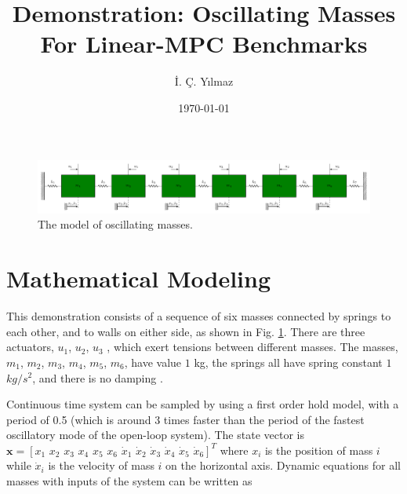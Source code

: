 \documentclass[12pt]{article}
\title{Demonstration: Oscillating Masses For Linear-MPC Benchmarks}
\author{İ. Ç. Yılmaz}
\date{\today}
\begin{document}
\maketitle%
\begin{figure}[b]
	\centering
	\includegraphics[width=1.0\textwidth,keepaspectratio]{images/oscillating_masses_tikz.pdf}
	\caption{The model of oscillating masses.} 
	\label{fig:oscillating_masses}	
\end{figure}
\section{Mathematical Modeling} \label{Mathematical_Modeling}
\noindent This demonstration consists of a sequence of six masses connected by springs to each other, and to walls on either side, as shown in Fig. \ref{fig:oscillating_masses}. There are three actuators, $u_{1}$, $u_{2}$, $u_{3}$ , which exert tensions between different masses. The masses, $m_{1}$, $m_{2}$, $m_{3}$, $m_{4}$, $m_{5}$, $m_{6}$, have value $1$ kg, the springs
all have spring constant $1$ $kg/s^{2}$, and there is no damping \cite{Wang2010}. \newline
\par\noindent Continuous time system can be sampled by using a first order
hold model, with a period of 0.5 (which is around 3 times faster than the period of the fastest oscillatory mode of the open-loop
system). The state vector is $\bm{x} = [x_{1}\,\,x_{2}\,\,x_{3}\,\,x_{4}\,\,x_{5}\,\,x_{6}\,\,\dot{x}_{1}\,\,\dot{x}_{2}\,\,\dot{x}_{3}\,\,\dot{x}_{4}\,\,\dot{x}_{5}\,\,\dot{x}_{6}]^T$ where $x_{i}$ is the position of mass $i$ while $\dot{x}_{i}$ is the velocity of mass $i$ on the horizontal axis. Dynamic equations for all masses with inputs of the system can be written as
\end{document}
